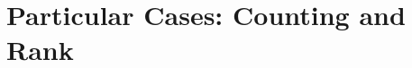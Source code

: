 \documentclass[../main/thesis.tex]{subfiles}
\begin{document}












\section{Particular Cases: Counting and Rank}
\end{document}
